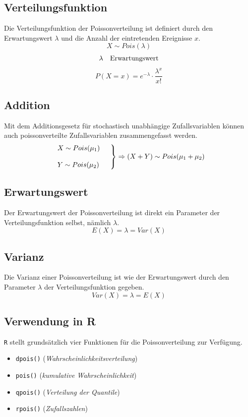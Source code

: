 \newpage

\subsection{Verteilungsfunktion}
Die Verteilungsfunktion der Poissonverteilung ist definiert
durch den Erwartungswert $\lambda$ und die Anzahl der eintretenden
Ereignisse $x$.
\[  
	X \sim Pois(\lambda)
\]
\[  \begin{array}{l l}
	\lambda	
		& \text{Erwartungswert}
\end{array} \]
\[  
	P(X=x) = e^{-\lambda} \cdot \frac{\lambda^x}{x!}
\]

\subsection{Addition}
Mit dem Additionsgesetz für stochastisch unabhängige Zufallsvariablen 
können auch poissonverteilte Zufallsvariablen zusammengefasst werden.
\[  
	\left.\begin{array}{l l}
		X \sim Pois(\mu_1) & \\
		& \\
		Y \sim Pois(\mu_2) & \\
	\end{array} \right\} 
	\Rightarrow (X+Y) \sim Pois(\mu_1 + \mu_2)
\]

\subsection{Erwartungswert}
Der Erwartungswert der Poissonverteilung ist direkt ein Parameter
der Verteilungsfunktion selbst, nämlich $\lambda$.
\[  
	E(X) = \lambda = Var(X) 
\]

\subsection{Varianz}
Die Varianz einer Poissonverteilung ist wie der Erwartungswert durch den 
Parameter $\lambda$ der Verteilungsfunktion gegeben.
\[  
	Var(X) = \lambda = E(X)
\]

\subsection{Verwendung in R}
\lstinline{R} stellt grundsätzlich vier Funktionen für die 
Poissonverteilung zur Verfügung. 
\begin{itemize}
	\item \lstinline{dpois()} \hfill{} 
		(\emph{Wahrscheinlichkeitsverteilung})
	\item \lstinline{pois()} \hfill{}
		(\emph{kumulative Wahrscheinlichkeit})
	\item \lstinline{qpois()} \hfill{}
		(\emph{Verteilung der Quantile})
	\item \lstinline{rpois()} \hfill{}
		(\emph{Zufallszahlen})
\end{itemize}





